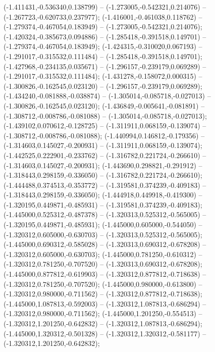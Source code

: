  (-1.411431,-0.536340,0.138799) -- (-1.273005,-0.542321,0.214076) -- (-1.267723,-0.620733,0.237977);
 (-1.416001,-0.461038,0.118762) -- (-1.279374,-0.467054,0.183949) -- (-1.273005,-0.542321,0.214076);
 (-1.420324,-0.385673,0.094886) -- (-1.285418,-0.391518,0.149701) -- (-1.279374,-0.467054,0.183949);
 (-1.424315,-0.310020,0.067193) -- (-1.291017,-0.315532,0.111484) -- (-1.285418,-0.391518,0.149701);
 (-1.427968,-0.234135,0.035671) -- (-1.296157,-0.239179,0.069289) -- (-1.291017,-0.315532,0.111484);
 (-1.431278,-0.158072,0.000315) -- (-1.300826,-0.162545,0.023120) -- (-1.296157,-0.239179,0.069289);
 (-1.434240,-0.081888,-0.038874) -- (-1.305014,-0.085718,-0.027013) -- (-1.300826,-0.162545,0.023120);
 (-1.436849,-0.005641,-0.081891) -- (-1.308712,-0.008786,-0.081088) -- (-1.305014,-0.085718,-0.027013);
 (-1.439102,0.070612,-0.128725) -- (-1.311911,0.068159,-0.139074) -- (-1.308712,-0.008786,-0.081088);
 (-1.440994,0.146812,-0.179356) -- (-1.314603,0.145027,-0.200931) -- (-1.311911,0.068159,-0.139074);
 (-1.442525,0.222901,-0.233762) -- (-1.316782,0.221724,-0.266610) -- (-1.314603,0.145027,-0.200931);
 (-1.443690,0.298821,-0.291912) -- (-1.318443,0.298159,-0.336050) -- (-1.316782,0.221724,-0.266610);
 (-1.444488,0.374513,-0.353772) -- (-1.319581,0.374239,-0.409183) -- (-1.318443,0.298159,-0.336050);
 (-1.444918,0.449918,-0.419300) -- (-1.320195,0.449871,-0.485931) -- (-1.319581,0.374239,-0.409183);
 (-1.445000,0.525312,-0.487378) -- (-1.320313,0.525312,-0.565005) -- (-1.320195,0.449871,-0.485931);
 (-1.445000,0.605000,-0.544050) -- (-1.320312,0.605000,-0.630703) -- (-1.320313,0.525312,-0.565005);
 (-1.445000,0.690312,-0.585028) -- (-1.320313,0.690312,-0.678208) -- (-1.320312,0.605000,-0.630703);
 (-1.445000,0.781250,-0.610312) -- (-1.320312,0.781250,-0.707520) -- (-1.320313,0.690312,-0.678208);
 (-1.445000,0.877812,-0.619903) -- (-1.320312,0.877812,-0.718638) -- (-1.320312,0.781250,-0.707520);
 (-1.445000,0.980000,-0.613800) -- (-1.320312,0.980000,-0.711562) -- (-1.320312,0.877812,-0.718638);
 (-1.445000,1.087813,-0.592003) -- (-1.320312,1.087813,-0.686294) -- (-1.320312,0.980000,-0.711562);
 (-1.445000,1.201250,-0.554513) -- (-1.320312,1.201250,-0.642832) -- (-1.320312,1.087813,-0.686294);
 (-1.445000,1.320312,-0.501328) -- (-1.320312,1.320312,-0.581177) -- (-1.320312,1.201250,-0.642832);
